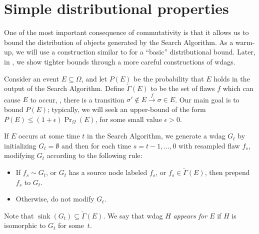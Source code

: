\documentclass{toc}
\newcommand{\eps}{\epsilon}
\DeclareMathOperator{\sink}{sink}
\begin{document}
\section{Simple distributional  properties}
\label{distrib-sec}
One of the most important consequence of commutativity is that it allows us to bound the distribution of objects generated by the Search Algorithm.   As a warm-up, we will use a construction similar to  for a ``basic'' distributional bound.  Later, in , we show tighter bounds through a more careful constructions of wdags. 

Consider an event $E \subseteq \Omega$, and let $P(E)$ be the probability that $E$ holds in the output of the Search Algorithm. Define $\check \Gamma(E)$ to be the set of flaws $f$ which can cause $E$ to occur, \ie, there is a transition $\sigma' \notin E \xrightarrow f \sigma \in E$.   Our main goal is to bound $P(E)$; typically, we will seek an upper-bound of the form $P(E) \leq (1 + \eps) \Pr_{\Omega}(E)$, for some small value $\eps > 0$.  


If $E$ occurs at some time $t$ in the Search Algorithm, we generate a wdag $G_t$ by initializing $G_t = \emptyset$ and then for each time $s = t-1, \dots, 0$ with resampled flaw $f_s$, modifying $G_t$ according to the following rule:
\begin{itemize}
\item If $f_s \sim G_t$, or $G_t$ has a source node labeled $f_s$, or $f_s \in \check \Gamma(E)$, then prepend $f_s$ to $G_t$. 
\item Otherwise, do not modify $G_t$. 
\end{itemize}

\noindent  %
Note that $\sink(G_t) \subseteq \check \Gamma(E)$. We say that wdag $H$ 
\emph{appears for $E$} if $H$ is isomorphic to $G_t$ %
%
%
for some~$t$.  %
\end{document}
